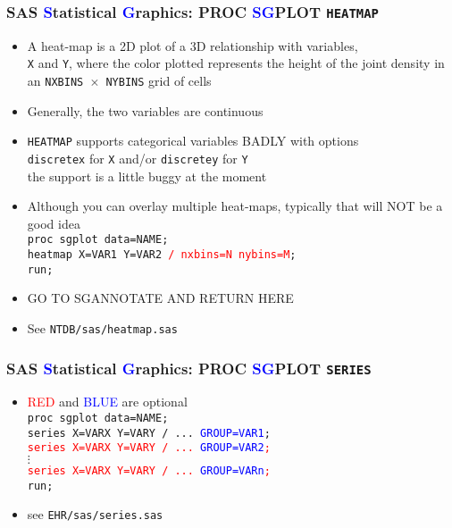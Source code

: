 \documentclass[11pt,pdftex,dvipsnames,usenames,helvetica]{beamer}
\begin{document}
\begin{frame}[fragile]
\frametitle{SAS \textcolor{blue}{S}tatistical \textcolor{blue}{G}raphics:
PROC \textcolor{blue}{SG}PLOT {\tt HEATMAP}}
\begin{itemize}
\item A heat-map is a 2D plot of a 3D relationship with variables,\\
  {\tt X} and {\tt Y}, where the color plotted represents the height
  of the joint density in an {\tt NXBINS $\times$ NYBINS} grid of cells
\item Generally, the two variables are continuous
\item {\tt HEATMAP} supports categorical variables BADLY with options\\  
{\tt discretex} for {\tt X} and/or {\tt discretey} for {\tt Y}\\
the support is a little buggy at the moment
\item Although you can overlay multiple heat-maps, typically that
  will NOT be a good idea\\
{\tt proc sgplot data=NAME;\\
heatmap X=VAR1 Y=VAR2 \textcolor{red}{/ nxbins=N nybins=M};\\
run;}
\item GO TO SGANNOTATE AND RETURN HERE
\item See {\tt NTDB/sas/heatmap.sas}
\end{itemize}
\end{frame}

\begin{frame}[fragile]
\frametitle{SAS \textcolor{blue}{S}tatistical \textcolor{blue}{G}raphics:
PROC \textcolor{blue}{SG}PLOT {\tt SERIES}}
\begin{itemize}
\item \textcolor{red}{RED} and \textcolor{blue}{BLUE} are optional\\
{\tt proc sgplot data=NAME;\\
series X=VARX Y=VARY  / ... \textcolor{blue}{GROUP=VAR1};\\
\textcolor{red}{series X=VARX Y=VARY / ... \textcolor{blue}{GROUP=VAR2};}\\
$\vdots$\\
\textcolor{red}{series X=VARX Y=VARY / ... \textcolor{blue}{GROUP=VARn};}\\
run;}
\item see {\tt EHR/sas/series.sas}
\end{itemize}
\end{frame}
\end{document}

